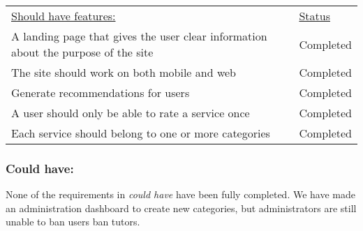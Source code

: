 \begin{table}[h]
    \begin{tabularx}{\textwidth}{|X|l|}
    \underline{Should have features:}                                                                 & \underline{Status} \\
    A landing page that gives the user clear information about the purpose of the site                & Completed \\
    The site should work on both mobile and web                                                       & Completed \\
    Generate recommendations for users                                                                & Completed \\
    A user should only be able to rate a service once                                                 & Completed \\
    Each service should belong to one or more categories                                              & Completed \\
   \end{tabularx}
\end{table}

\subsubsection{Could have:}
None of the requirements in \textit{could have} have been fully completed.
We have made an administration dashboard to create new categories, but administrators are still unable to ban users ban tutors.


